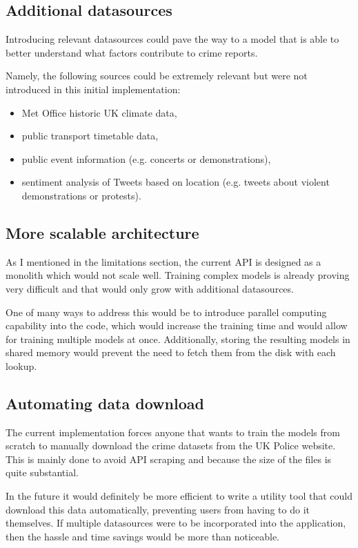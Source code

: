 \documentclass{article}
\begin{document}
	\subsection{Additional datasources}

	Introducing relevant datasources could pave the way to a model that is able to better understand what factors contribute to crime reports.

	Namely, the following sources could be extremely relevant but were not introduced in this initial implementation:

	\begin{itemize}
		\item Met Office historic UK climate data,
		\item public transport timetable data,
		\item public event information (e.g. concerts or demonstrations),
		\item sentiment analysis of Tweets based on location (e.g. tweets about violent demonstrations or protests).
	\end{itemize}

	\subsection{More scalable architecture}

	As I mentioned in the limitations section, the current API is designed as a monolith which would not scale well. Training complex models is already proving very difficult and that would only grow with additional datasources.

	One of many ways to address this would be to introduce parallel computing capability into the code, which would increase the training time and would allow for training multiple models at once. Additionally, storing the resulting models in shared memory would prevent the need to fetch them from the disk with each lookup.

	\subsection{Automating data download}

	The current implementation forces anyone that wants to train the models from scratch to manually download the crime datasets from the UK Police website. This is mainly done to avoid API scraping and because the size of the files is quite substantial.

	In the future it would definitely be more efficient to write a utility tool that could download this data automatically, preventing users from having to do it themselves. If multiple datasources were to be incorporated into the application, then the hassle and time savings would be more than noticeable.

	\newpage
	
\end{document}
